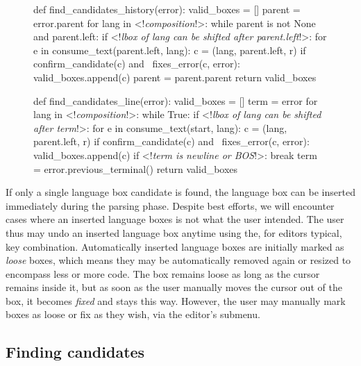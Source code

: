 \documentclass[sigplan,screen]{acmart}\settopmatter{printfolios=true,printccs=false,printacmref=false}
\begin{document}
\begin{figure}[t]
\begin{lstdefault}
def find_candidates_history(error):
  valid_boxes = []
  parent = error.parent
  for lang in <!\textit{composition}!>:
    while parent is not None and parent.left:
      if <!\textit{lbox of lang can be shifted after parent.left}!>:
        for e in consume_text(parent.left, lang):
          c = (lang, parent.left, r)
          if confirm_candidate(c) and \
              fixes_error(c, error):
            valid_boxes.append(c)
      parent = parent.parent
  return valid_boxes
\end{lstdefault}
\caption{}
\label{lst_find_candidates}
\end{figure}

\begin{figure}[t]
\begin{lstdefault}
def find_candidates_line(error):
  valid_boxes = []
  term = error
  for lang in <!\textit{composition}!>:
    while True:
      if <!\textit{lbox of lang can be shifted after term}!>:
        for e in consume_text(start, lang):
          c = (lang, parent.left, r)
          if confirm_candidate(c) and \
              fixes_error(c, error):
            valid_boxes.append(c)
      if <!\textit{term is newline or BOS}!>:
        break
      term = error.previous_terminal()
  return valid_boxes
\end{lstdefault}
\caption{}
\label{lst_find_candidates}
\end{figure}

If only a single language box candidate is found, the language box can be
inserted immediately during the parsing phase. Despite best efforts,
we will encounter cases where an inserted language boxes is not what the user
intended. The user thus may undo an inserted language box anytime using the,
for editors typical, \keys{Ctrl+Z} key combination. Automatically inserted
language boxes are initially marked as \emph{loose} boxes, which means they may
be automatically removed again or resized to encompass less or more code. The
box remains loose as long as the cursor remains inside it, but as soon as the
user manually moves the cursor out of the box, it becomes \emph{fixed} and stays this
way. However, the user may manually mark boxes as loose or fix as they wish,
via the editor's submenu\lukas{Not yet implemented in Eco}.

\subsection{Finding candidates}
\end{document}
